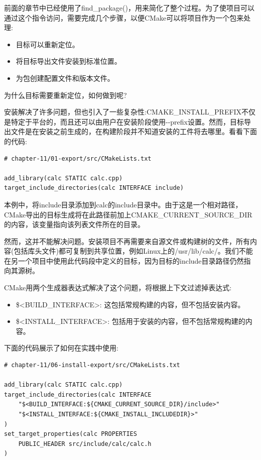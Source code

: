 
前面的章节中已经使用了find\_package()，用来简化了整个过程。为了使项目可以通过这个指令访问，需要完成几个步骤，以便CMake可以将项目作为一个包来处理:

\begin{itemize}
\item 
目标可以重新定位。

\item 
将目标导出文件安装到标准位置。

\item 
为包创建配置文件和版本文件。
\end{itemize}

为什么目标需要重新定位，如何做到呢?


安装解决了许多问题，但也引入了一些复杂性:CMAKE\_INSTALL\_PREFIX不仅是特定于平台的，而且还可以由用户在安装阶段使用-{}-prefix设置。然而，目标导出文件是在安装之前生成的，在构建阶段并不知道安装的工件将去哪里。看看下面的代码:

\begin{lstlisting}[style=styleCMake]
# chapter-11/01-export/src/CMakeLists.txt

add_library(calc STATIC calc.cpp)
target_include_directories(calc INTERFACE include)
\end{lstlisting}

本例中，将include目录添加到calc的include目录中。由于这是一个相对路径，CMake导出的目标生成将在此路径前加上CMAKE\_CURRENT\_SOURCE\_DIR的内容，该变量指向该列表文件所在的目录。

然而，这并不能解决问题。安装项目不再需要来自源文件或构建树的文件，所有内容(包括库头文件)都可复制到共享位置，例如Linux上的/usr/lib/calc/。我们不能在另一个项目中使用此代码段中定义的目标，因为目标的include目录路径仍然指向其源树。

CMake用两个生成器表达式解决了这个问题，将根据上下文过滤掉表达式:

\begin{itemize}
\item 
\$<BUILD\_INTERFACE>: 这包括常规构建的内容，但不包括安装内容。

\item 
\$<INSTALL\_INTERFACE>: 包括用于安装的内容，但不包括常规构建的内容。
\end{itemize}

下面的代码展示了如何在实践中使用:

\begin{lstlisting}[style=styleCMake]
# chapter-11/06-install-export/src/CMakeLists.txt

add_library(calc STATIC calc.cpp)
target_include_directories(calc INTERFACE
	"$<BUILD_INTERFACE:${CMAKE_CURRENT_SOURCE_DIR}/include>"
	"$<INSTALL_INTERFACE:${CMAKE_INSTALL_INCLUDEDIR}>"
)
set_target_properties(calc PROPERTIES
	PUBLIC_HEADER src/include/calc/calc.h
)
\end{lstlisting}

